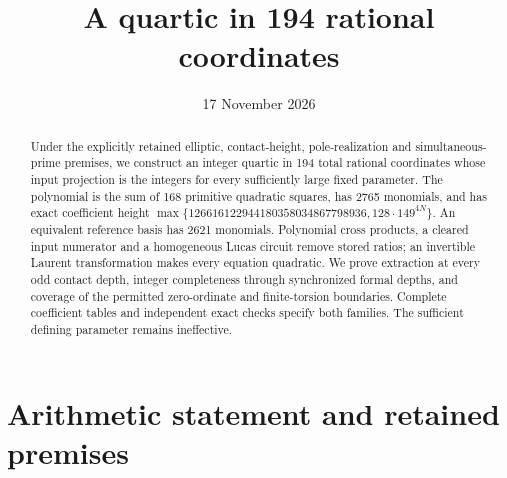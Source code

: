 \documentclass[11pt,a4paper]{article}
\title{A quartic in 194 rational coordinates}
\author{}\date{17 November 2026}
\begin{document}
\maketitle

\begin{abstract}
Under the explicitly retained elliptic, contact-height, pole-realization
and simultaneous-prime premises, we construct an integer quartic in
194 total rational coordinates whose input projection is the integers
for every sufficiently large fixed parameter. The polynomial is the
sum of 168 primitive quadratic squares, has 2765 monomials, and has
exact coefficient height
$\max\{126616122944180358034867798936,128\cdot149^{4N}\}$.
An equivalent reference basis has 2621 monomials. Polynomial cross
products, a cleared input numerator and a homogeneous Lucas circuit
remove stored ratios; an invertible Laurent transformation makes every
equation quadratic. We prove extraction at every odd contact depth,
integer completeness through synchronized formal depths, and coverage
of the permitted zero-ordinate and finite-torsion boundaries. Complete
coefficient tables and independent exact checks specify both families.
The sufficient defining parameter remains ineffective.
\end{abstract}

\section{Arithmetic statement and retained premises}
\end{document}
